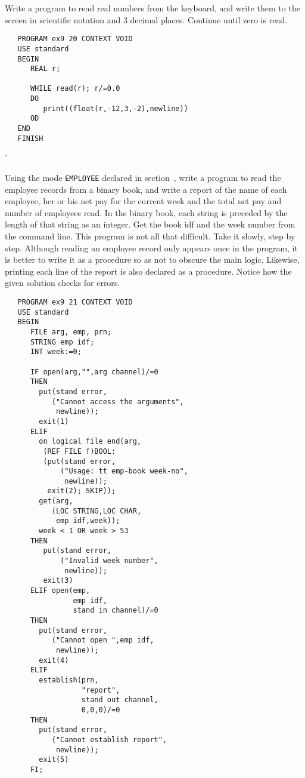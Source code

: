 \begin{exercise}
\item Write a program to read real numbers from the keyboard, and
write them to the screen in scientific notation and 3 decimal places.
Continue until zero is read. \ans \ %
\begin{verbatim}
   PROGRAM ex9 20 CONTEXT VOID
   USE standard
   BEGIN
      REAL r;

      WHILE read(r); r/=0.0
      DO
         print((float(r,-12,3,-2),newline))
      OD
   END
   FINISH
\end{verbatim}
'
\item Using the mode \verb|EMPLOYEE| declared in
section~, write a program to read the employee
records from a binary book, and write a report of the name of each
employee, her or his net pay for the current week and the total net
pay and number of employees read. In the binary book, each string is
preceded by the length of that string as an integer. Get the book idf
and the week number from the command line. \ans This program is not
all that difficult. Take it slowly, step by step.  Although reading
an employee record only appears once in the program, it is better to
write it as a procedure so as not to obscure the main logic.
Likewise, printing each line of the report is also declared as a
procedure. Notice how the given solution checks for errors.
\begin{verbatim}
   PROGRAM ex9 21 CONTEXT VOID
   USE standard
   BEGIN
      FILE arg, emp, prn;
      STRING emp idf;
      INT week:=0;

      IF open(arg,"",arg channel)/=0
      THEN
        put(stand error,
           ("Cannot access the arguments",
            newline));
        exit(1)
      ELIF
        on logical file end(arg,
         (REF FILE f)BOOL:
         (put(stand error,
             ("Usage: tt emp-book week-no",
              newline));
          exit(2); SKIP));
        get(arg,
           (LOC STRING,LOC CHAR,
            emp idf,week));
        week < 1 OR week > 53
      THEN
         put(stand error,
             ("Invalid week number",
              newline));
         exit(3)
      ELIF open(emp,
                emp idf,
                stand in channel)/=0
      THEN
        put(stand error,
           ("Cannot open ",emp idf,
            newline));
        exit(4)
      ELIF
        establish(prn,
                  "report",
                  stand out channel,
                  0,0,0)/=0
      THEN
        put(stand error,
           ("Cannot establish report",
            newline));
        exit(5)
      FI;


\end{verbatim}
\end{exercise}
